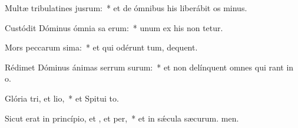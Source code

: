 \item Multæ tribulatines jusrum:~* et de ómnibus his liberábit os minus.
\item Custódit Dóminus ómnia sa erum:~* unum ex his non tetur.
\item Mors peccarum sima:~* et qui odérunt tum, dequent.
\item Rédimet Dóminus ánimas serrum surum:~* et non delínquent omnes qui rant in o.
\item Glória tri, et lio,~* et Spitui to.
\item Sicut erat in princípio, et , et per,~* et in sǽcula sæcurum. men.
